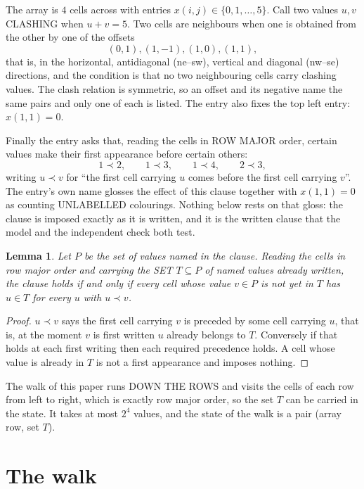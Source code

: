 \documentclass[11pt,a4paper]{article}
\theoremstyle{plain}
\newtheorem{lemma}[theorem]{Lemma}
\theoremstyle{definition}
\begin{document}
The array is $4$ cells across with entries $x(i,j)\in\{0,1,\dots,5\}$. Call two values $u,v$ CLASHING
when $u+v=5$. Two cells are neighbours when one is obtained from the other by one of
the offsets
\[
(0,1), (1,-1), (1,0), (1,1),
\]
that is, in the horizontal, antidiagonal (ne--sw), vertical and diagonal (nw--se) directions, and the condition is that no two neighbouring cells carry
clashing values. The clash relation is symmetric, so an offset and its negative name the
same pairs and only one of each is listed. The entry also fixes the top left entry: $x(1,1)=0$.

Finally the entry asks that, reading the cells in ROW MAJOR order, certain values make their
first appearance before certain others:
\[
1\prec 2,\qquad 1\prec 3,\qquad 1\prec 4,\qquad 2\prec 3 ,
\]
writing $u\prec v$ for ``the first cell carrying $u$ comes before the first cell carrying
$v$''. The entry's own name glosses the effect of this clause together with $x(1,1)=0$ as
counting UNLABELLED colourings. Nothing below rests on that gloss: the clause is imposed
exactly as it is written, and it is the written clause that the model and the independent
check both test.

\begin{lemma}\label{lem:seen}
Let $P$ be the set of values named in the clause. Reading the cells in row major order and
carrying the SET $T\subseteq P$ of named values already written, the clause holds if and only
if every cell whose value $v\in P$ is not yet in $T$ has $u\in T$ for every $u$ with $u\prec v$.
\end{lemma}

\begin{proof}
$u\prec v$ says the first cell carrying $v$ is preceded by some cell carrying $u$, that is, at
the moment $v$ is first written $u$ already belongs to $T$. Conversely if that holds at each
first writing then each required precedence holds. A cell whose value is already in $T$ is not
a first appearance and imposes nothing.
\end{proof}

The walk of this paper runs DOWN THE ROWS and visits the cells of each row from left to right,
which is exactly row major order, so the set $T$ can be carried in the state. It takes at most
$2^{4}$ values, and the state of the walk is a pair (array row, set $T$).

\section{The walk}
\end{document}
